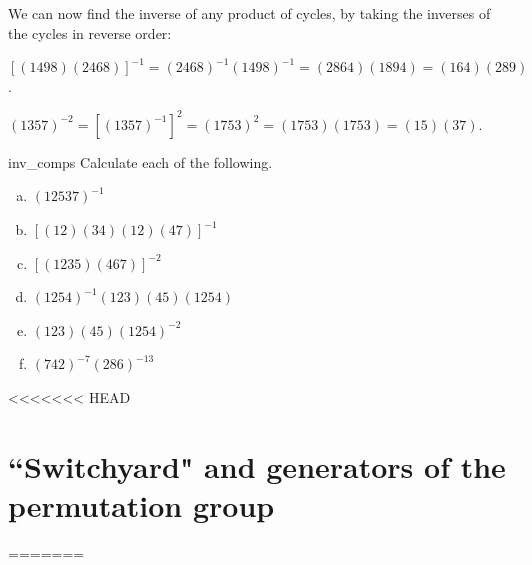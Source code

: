 We can now find the inverse of any product of cycles, by taking the inverses of the cycles in reverse order:

\begin{example}{}
$\left[ ( 1 4 9 8 )( 2 4 6 8 ) \right] ^{-1} = ( 2 4 6 8 )^{-1}( 1 4 9 8 )^{-1} = ( 2 8 6 4 )(1 8 9 4) = ( 1 6 4)( 2 8 9)$. 
\end{example}

\begin{example}{}
$( 1 3 5 7) ^{-2} = \left[ ( 1 3 5 7 )^{-1} \right]^2 = ( 1 7  5 3 )^2 = ( 1 7 5 3 )(1 7 5 3) = ( 1 5 )(3 7)$. 
\end{example}


\begin{exercise}{inv_comps}
Calculate each of the following.
\begin{multicols}{2}
\begin{enumerate}[(a)]    
\item
$(1 2 5 3 7)^{-1}$
 \item
$[(1 2)(3 4)(1 2)(4 7)]^{-1}$
\item
$[( 1 2 3 5 )( 4 6 7 )]^{-2}$
\item
$( 1 2 5 4 )^{-1} ( 1 2 3 )( 4 5 ) ( 1 2 5 4 )$
\item
$( 1 2 3 )( 4 5 ) ( 1 2 5 4 )^{-2}$
\item
$( 7 4 2 )^{-7} ( 2 8 6)^{-13}$

 \end{enumerate}
\end{multicols}
\end{exercise}


<<<<<<< HEAD
\section{``Switchyard" and generators of the permutation group }
=======
